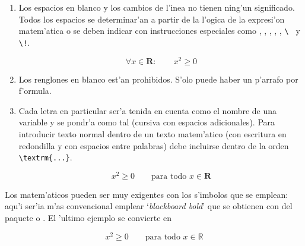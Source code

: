 \begin{enumerate}

\item Los espacios en blanco y los cambios de l'inea no tienen ning'un
  significado. Todos los espacios se determinar'an a partir de la
  l'ogica de la expresi'on matem'atica o se deben indicar con
  instrucciones especiales como \ci{,}, , , \ci{:},
  \ci{;}, \verb*|\ | y \verb|\!|.%
%
%

\begin{example}
\begin{equation}
\forall x \in \mathbf{R}:
\qquad x^{2} \geq 0
\end{equation}
\end{example}
 
\item Los renglones en blanco est'an prohibidos. S'olo puede haber un
  p'arrafo por f'ormula.
\item Cada letra en particular ser'a tenida en cuenta como el nombre
  de una variable y se pondr'a como tal (cursiva con espacios
  adicionales). Para introducir texto normal dentro de un texto
  matem'atico (con escritura en redondilla y con espacios entre
  palabras) debe incluirse dentro de la orden \verb|\textrm{...}|.

\begin{example}
\begin{equation}
x^{2} \geq 0\qquad
\textrm{para todo }x\in\mathbf{R}
\end{equation}
\end{example}
 
\end{enumerate}

%
%

Los matem'aticos pueden ser muy exigentes con los s'imbolos que se
emplean: aqu'i ser'ia m'as convencional emplear `\emph{blackboard
  bold}'   que se obtienen con  del
paquete  o .  \ifx\mathbb\undefined\else El
'ultimo ejemplo se convierte en
\begin{example}
\begin{displaymath}
x^{2} \geq 0\qquad
\textrm{para todo }x\in\mathbb{R}
\end{displaymath}
\end{example}
\fi

